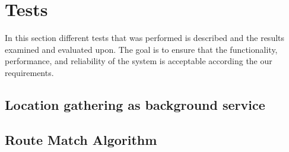 \section{Tests}\label{sub:s3test}
In this section different tests that was performed is described and the results examined and evaluated upon.
The goal is to ensure that the functionality, performance, and reliability of the system is acceptable according the our requirements.

\subsection{Location gathering as background service}\label{subsec:bgstest2}



\subsection{Route Match Algorithm}\label{subsec:algotest}

